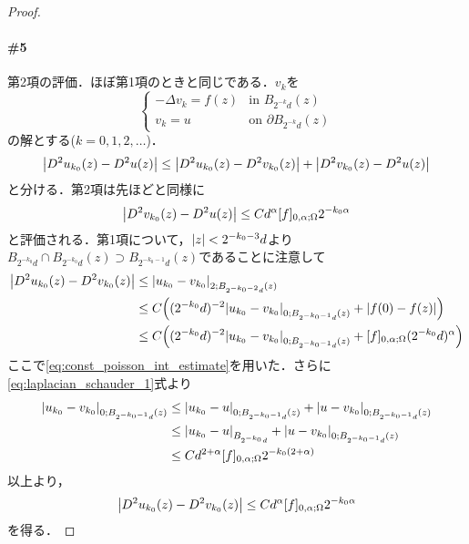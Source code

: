\documentclass[a4paper]{ltjsarticle}
\newcommand{\Om}{\Omega}
\newcommand{\1}{\mathbbm{1}}
\numberwithin{equation}{section}
\theoremstyle{definition}
\begin{document}
\begin{proof}
    \paragraph*{\#5}第2項の評価．ほぼ第1項のときと同じである．$v_k$を
    \begin{equation}
        \left\{
            \begin{array}{rl}
                -\Delta v_k = f(z) & \text{in $B_{2^{-k}d}(z)$}\\
                v_k=u\quad\  & \text{on $\partial B_{2^{-k}d}(z)$}
            \end{array}
        \right.
    \end{equation}
    の解とする($k=0,1,2,\ldots$)．
    \begin{equation}
        \abs{D^2u_{k_0}(z)-D^2u(z)}\leq \abs{D^2u_{k_0}(z)-D^2v_{k_0}(z)}+\abs{D^2v_{k_0}(z)-D^2u(z)}
    \end{equation}
    と分ける．第2項は先ほどと同様に
    \begin{equation}
        \abs{D^2v_{k_0}(z)-D^2u(z)}\leq Cd^{\alpha}[f]_{0,\alpha;\Om}2^{-k_0\alpha} 
    \end{equation}
    と評価される．第1項について，$\abs{z}<2^{-k_0-3}d$より$B_{2^{-k_0}d}\cap B_{2^{-k_0}d}(z)\supset B_{2^{-k_0-1}d}(z)$であることに注意して
    \begin{align}
        \abs{D^2u_{k_0}(z)-D^2v_{k_0}(z)}&\leq \abs{u_{k_0}-v_{k_0}}_{2;B_{2^{-k_0-2}d}(z)}\\
        &\leq C\qty((2^{-k_0}d)^{-2}\abs{u_{k_0}-v_{k_0}}_{0;B_{2^{-k_0-1}d}(z)}+\abs{f(0)-f(z)})\\
        &\leq C\qty((2^{-k_0}d)^{-2}\abs{u_{k_0}-v_{k_0}}_{0;B_{2^{-k_0-1}d}(z)}+[f]_{0,\alpha;\Om}(2^{-k_0}d)^{\alpha})
    \end{align}
    ここで\eqref{eq:const_poisson_int_estimate}を用いた．さらに\eqref{eq:laplacian_schauder_1}式より
    \begin{align}
        \abs{u_{k_0}-v_{k_0}}_{0;B_{2^{-k_0-1}d}(z)}&\leq \abs{u_{k_0}-u}_{0;B_{2^{-k_0-1}d}(z)}+\abs{u-v_{k_0}}_{0;B_{2^{-k_0-1}d}(z)}\\
        &\leq \abs{u_{k_0}-u}_{B_{2^{-k_0}d}}+\abs{u-v_{k_0}}_{0;B_{2^{-k_0-1}d}(z)}\\
        &\leq Cd^{2+\alpha}[f]_{0,\alpha;\Om}2^{-k_0(2+\alpha)} 
    \end{align}
    以上より，
    \begin{equation}
        \abs{D^2u_{k_0}(z)-D^2v_{k_0}(z)}\leq Cd^{\alpha}[f]_{0,\alpha;\Om}2^{-k_0\alpha}
    \end{equation}
    を得る．


\end{proof}
\end{document}
